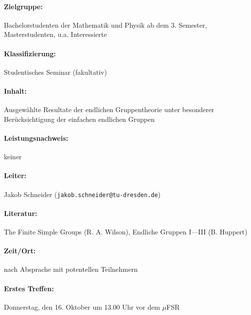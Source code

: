 \documentclass[a4paper]{article}
\begin{document}
\paragraph{Zielgruppe:} Bachelorstudenten der Mathematik und Physik ab dem 3. Semester, Masterstudenten, u.a. Interessierte
\paragraph{Klassifizierung:} Studentisches Seminar (fakultativ)
\paragraph{Inhalt:} Ausgewählte Resultate der endlichen Gruppentheorie unter besonderer Berücksichtigung der einfachen endlichen Gruppen
\paragraph{Leistungsnachweis:} keiner
\paragraph{Leiter:} Jakob Schneider ({\tt jakob.schneider@tu-dresden.de})
\paragraph{Literatur:} The Finite Simple Groups (R. A. Wilson), Endliche Gruppen I---III (B. Huppert) 
\paragraph{Zeit/Ort:} nach Absprache mit potentellen Teilnehmern
\paragraph{Erstes Treffen:} Donnerstag, den 16. Oktober um 13.00 Uhr vor dem $\mu$FSR
\end{document}
